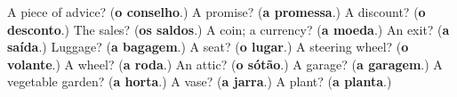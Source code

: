\begin{tcolorbox}[breakable,colback=teal!4,colframe=teal!35!black,title={Before you move on}]
A piece of advice? (\textbf{o conselho}.) A promise? (\textbf{a promessa}.) A discount? (\textbf{o desconto}.) The sales? (\textbf{os saldos}.) A coin; a currency? (\textbf{a moeda}.) An exit? (\textbf{a saída}.) Luggage? (\textbf{a bagagem}.) A seat? (\textbf{o lugar}.) A steering wheel? (\textbf{o volante}.) A wheel? (\textbf{a roda}.) An attic? (\textbf{o sótão}.) A garage? (\textbf{a garagem}.) A vegetable garden? (\textbf{a horta}.) A vase? (\textbf{a jarra}.) A plant? (\textbf{a planta}.)
\end{tcolorbox}
